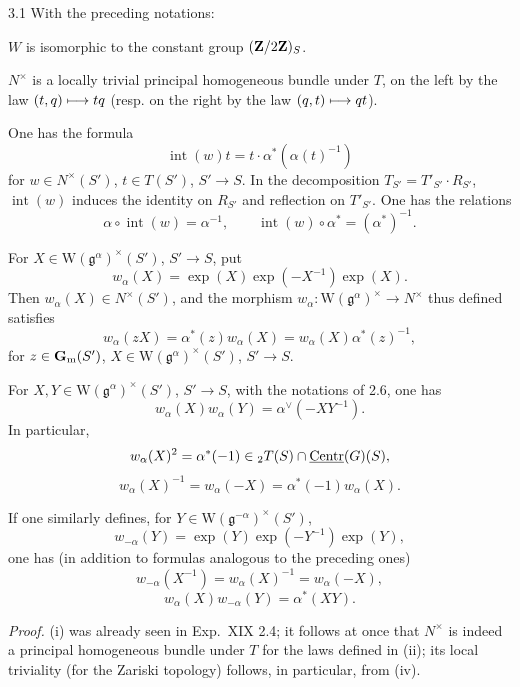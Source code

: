 \begin{theorem}{3.1}\label{XX.3.1}
With the preceding notations:
\begin{enumeratei}
\item $W$ is isomorphic to the constant group $(\mathbf{Z}/2\mathbf{Z})_S$.
\item $N^\times$ is a locally trivial principal homogeneous bundle under $T$, on the left by the law $(t,q)\longmapsto tq$ (resp. on the right by the law $(q,t)\longmapsto qt$).
\item One has the formula
\[
\operatorname{int}(w)t=t\cdot\alpha^*(\alpha(t)^{-1})
\]
for $w\in N^\times(S')$, $t\in T(S')$, $S'\to S$. In the decomposition $T_{S'}=T'_{S'}\cdot R_{S'}$, $\operatorname{int}(w)$ induces the identity on $R_{S'}$ and reflection on $T'_{S'}$. One has the relations
\[
\alpha\circ\operatorname{int}(w)=\alpha^{-1},\qquad\operatorname{int}(w)\circ\alpha^*=(\alpha^*)^{-1}.
\]
\item For $X\in\mathrm W(\mathfrak g^\alpha)^\times(S')$, $S'\to S$, put
\[
w_\alpha(X)=\exp(X)\exp(-X^{-1})\exp(X).
\]
Then $w_\alpha(X)\in N^\times(S')$, and the morphism $w_\alpha:\mathrm W(\mathfrak g^\alpha)^\times\to N^\times$ thus defined satisfies
\[
w_\alpha(zX)=\alpha^*(z)w_\alpha(X)=w_\alpha(X)\alpha^*(z)^{-1},
\]
for $z\in\mathbf{G}_{\mathrm{m}}(S')$, $X\in\mathrm W(\mathfrak g^\alpha)^\times(S')$, $S'\to S$.
\item {\renewcommand{\thefootnote}{(25)}}%
For $X,Y\in\mathrm W(\mathfrak g^\alpha)^\times(S')$, $S'\to S$, with the notations of 2.6, one has
\[
w_\alpha(X)w_\alpha(Y)=\alpha^\vee(-XY^{-1}).
\]
In particular,
\[
w_\alpha(X)^2=\alpha^*(-1)\in{}_2T(S)\cap\underline{\mathrm{Centr}}(G)(S),
\]
\[
w_\alpha(X)^{-1}=w_\alpha(-X)=\alpha^*(-1)w_\alpha(X).
\]
\item If one similarly defines, for $Y\in\mathrm W(\mathfrak g^{-\alpha})^\times(S')$,
\[
w_{-\alpha}(Y)=\exp(Y)\exp(-Y^{-1})\exp(Y),
\]
one has (in addition to formulas analogous to the preceding ones)
\[
w_{-\alpha}(X^{-1})=w_\alpha(X)^{-1}=w_\alpha(-X),
\]
\[
w_\alpha(X)w_{-\alpha}(Y)=\alpha^*(XY).
\]
\end{enumeratei}
\end{theorem}
\emph{Proof.} (i) was already seen in Exp.~XIX 2.4; it follows at once that $N^\times$ is indeed a principal homogeneous bundle under $T$ for the laws defined in (ii); its local triviality (for the Zariski topology) follows, in particular, from (iv).

